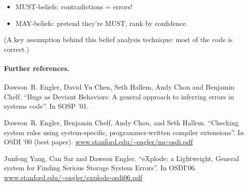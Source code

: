 \documentclass[11pt]{article}
\begin{document}
\begin{itemize}[noitemsep]
\item      MUST-beliefs: contradictions = errors!
\item      MAY-beliefs: pretend they're MUST, rank by confidence.
\end{itemize}
(A key assumption behind this belief analysis technique: most of the code is correct.)

\paragraph{Further references.}
Dawson~R. Engler, David Yu Chen, Seth Hallem, Andy Chou and Benjamin Chelf.
``Bugs as Deviant Behaviors: A general approach to inferring errors in systems code''.
In SOSP '01.

Dawson~R. Engler, Benjamin Chelf, Andy Chou, and Seth Hallem.
``Checking system rules using system-specific, programmer-written
  compiler extensions''.
In OSDI '00 (best paper).
\url{www.stanford.edu/~engler/mc-osdi.pdf}

Junfeng Yang, Can Sar and Dawson Engler.
``eXplode: a Lightweight, General system for Finding Serious Storage System Errors''.
In OSDI'06.
\url{www.stanford.edu/~engler/explode-osdi06.pdf}
\end{document}
